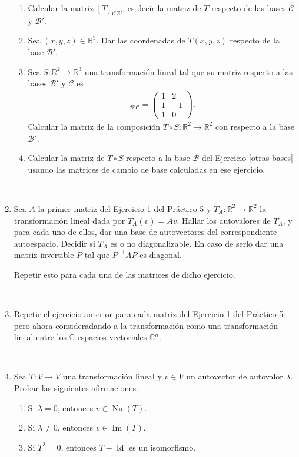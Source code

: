 \documentclass[12pt]{amsart}
\begin{document}
\begin{enumerate}
\begin{enumerate}
 \item Calcular la matriz $[T]_{\mathcal{C}\mathcal{B}'}$, es decir la matriz de $T$ respecto de las bases $\mathcal{C}$ y $\mathcal{B}'$.
 \item Sea $(x,y,z)\in\mathbb{R}^3$. Dar las coordenadas de $T(x,y,z)$ respecto de la base $\mathcal{B}'$.
 \item Sea $S:\mathbb{R}^2\longrightarrow\mathbb{R}^3$ una transformaci\'on lineal tal que su matriz respecto a las bases $\mathcal{B}'$ y $\mathcal{C}$ es
 \begin{align*}
[S]_{\mathcal{B}'\mathcal{C}}=\left(\begin{array}{cr}
1&2\\1&-1\\1&0
\end{array}\right). 
 \end{align*}
Calcular la matriz de la composici\'on $T\circ S:\mathbb{R}^2\longrightarrow\mathbb{R}^2$ con respecto a la base $\mathcal{B}'$. 
\item Calcular la matriz de $T\circ S$ respecto a la base $\mathcal{B}$ del Ejercicio \eqref{otras bases} usando las matrices de cambio de base calculadas en ese ejercicio.
\end{enumerate}

\

\item Sea $A$ la primer matriz del Ejercicio 1 del Pr\'actico 5 y $T_A:\mathbb{R}^2\longrightarrow\mathbb{R}^2$ la transformaci\'on lineal dada por $T_A(v)=Av$. Hallar los autovalores de $T_A$, y para cada uno de ellos, dar una base de autovectores del correspondiente autoespacio. Decidir si $T_A$ es o no diagonalizable. En caso de serlo dar una matriz invertible $P$ tal que $P^{-1}AP$ es diagonal. 

Repetir esto para cada una de las matrices de dicho ejercicio.

\

\item Repetir el ejercicio anterior para cada matriz del Ejercicio 1 del Pr\'actico 5 pero ahora consideradando a la transformaci\'on como una transformaci\'on lineal entre los $\mathbb{C}$-espacios vectoriales $\mathbb{C}^n$.

\

\item Sea $T:V\longrightarrow V$ una transformaci\'on lineal y $v\in V$ un autovector de autovalor $\lambda$. Probar las siguientes afirmaciones.
\begin{enumerate}
 \item Si $\lambda=0$, entonces $v\in\operatorname{Nu}(T)$.
 \item Si $\lambda\neq0$, entonces $v\in\operatorname{Im}(T)$.
  \item Si $T^2=0$, entonces $T-\operatorname{Id}$ es un isomorfismo.
\end{enumerate}


\end{enumerate}
\end{document}
